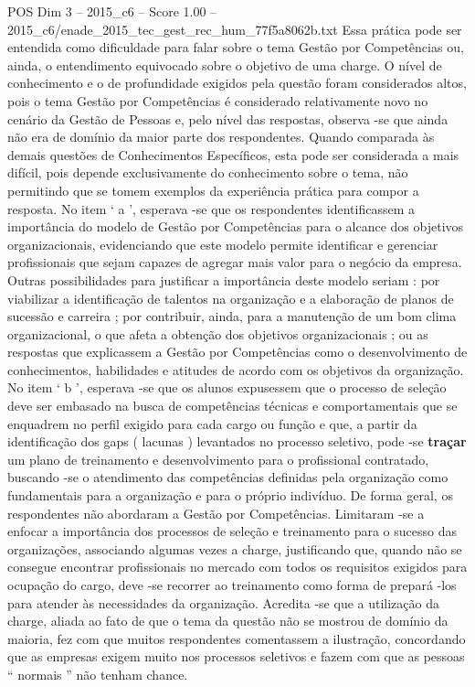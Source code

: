 \begin{textsample}{POS Dim 3 – 2015\_c6 – Score 1.00 – 2015\_c6/enade\_2015\_tec\_gest\_rec\_hum\_77f5a8062b.txt}
Essa prática pode ser entendida como dificuldade para falar sobre o tema Gestão por Competências ou, ainda, o entendimento equivocado sobre o objetivo de uma charge.
O nível de conhecimento e o de profundidade exigidos pela questão foram considerados altos, pois o tema Gestão por Competências é considerado relativamente novo no cenário da Gestão de Pessoas e, pelo nível das respostas, observa -se que ainda não era de domínio da maior parte dos respondentes.
Quando comparada às demais questões de Conhecimentos Específicos, esta pode ser considerada a mais difícil, pois depende exclusivamente do conhecimento sobre o tema, não permitindo que se tomem exemplos da experiência prática para compor a resposta.
No item ‘ a ’, esperava -se que os respondentes identificassem a importância do modelo de Gestão por Competências para o alcance dos objetivos organizacionais, evidenciando que este modelo permite identificar e gerenciar profissionais que sejam capazes de agregar mais valor para o negócio da empresa.
Outras possibilidades para justificar a importância deste modelo seriam : por viabilizar a identificação de talentos na organização e a elaboração de planos de sucessão e carreira ; por contribuir, ainda, para a manutenção de um bom clima organizacional, o que afeta a obtenção dos objetivos organizacionais ; ou as respostas que explicassem a Gestão por Competências como o desenvolvimento de conhecimentos, habilidades e atitudes de acordo com os objetivos da organização.
No item ‘ b ’, esperava -se que os alunos expusessem que o processo de seleção deve ser embasado na busca de competências técnicas e comportamentais que se enquadrem no perfil exigido para cada cargo ou função e que, a partir da identificação dos gaps ( lacunas ) levantados no processo seletivo, pode -se \textbf{traçar} um plano de treinamento e desenvolvimento para o profissional contratado, buscando -se o atendimento das competências definidas pela organização como fundamentais para a organização e para o próprio indivíduo.
De forma geral, os respondentes não abordaram a Gestão por Competências.
Limitaram -se a enfocar a importância dos processos de seleção e treinamento para o sucesso das organizações, associando algumas vezes a charge, justificando que, quando não se consegue encontrar profissionais no mercado com todos os requisitos exigidos para ocupação do cargo, deve -se recorrer ao treinamento como forma de prepará -los para atender às necessidades da organização.
Acredita -se que a utilização da charge, aliada ao fato de que o tema da questão não se mostrou de domínio da maioria, fez com que muitos respondentes comentassem a ilustração, concordando que as empresas exigem muito nos processos seletivos e fazem com que as pessoas “ normais ” não tenham chance.

\end{textsample}
